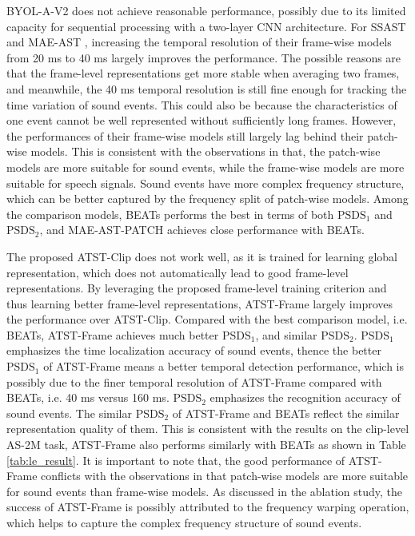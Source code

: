 BYOL-A-V2 does not achieve reasonable performance, possibly due to its limited capacity for sequential processing with a two-layer CNN architecture.
For SSAST \cite{gong_ssast_2022} and MAE-AST \cite{baade_mae-ast_2022}, increasing the temporal resolution of their frame-wise models from 20 ms to 40 ms largely improves the performance. The possible reasons are that the frame-level representations get more stable when averaging two frames, and meanwhile, the 40 ms temporal resolution is still fine enough for tracking the time variation of sound events. This could also be because the characteristics of one event cannot be well represented without sufficiently long frames. However, the performances of their frame-wise models still largely lag behind their patch-wise models. This is consistent with the observations in \cite{gong_ssast_2022,baade_mae-ast_2022} that, the patch-wise models are more suitable for sound events, while the frame-wise models are more suitable for speech signals. Sound events have more complex frequency structure, which can be better captured by the frequency split of patch-wise models. Among the comparison models, BEATs performs the best in terms of both $\text{PSDS}_1$ and $\text{PSDS}_2$, and MAE-AST-PATCH achieves close performance with BEATs. 

The proposed ATST-Clip does not work well, as it is trained for learning global representation, which does not automatically lead to good frame-level representations. By leveraging the proposed frame-level training criterion and thus learning better frame-level representations, ATST-Frame largely improves the performance over ATST-Clip.  Compared with the best comparison model, i.e. BEATs, ATST-Frame achieves much better $\text{PSDS}_1$, and similar $\text{PSDS}_2$. 
$\text{PSDS}_1$ emphasizes the time localization accuracy of sound events, thence the better $\text{PSDS}_1$ of ATST-Frame means a better temporal detection performance, which is possibly due to the finer temporal resolution of ATST-Frame compared with BEATs, i.e. 40 ms versus 160 ms. 
$\text{PSDS}_2$ emphasizes the recognition accuracy of sound events. The similar $\text{PSDS}_2$ of ATST-Frame and BEATs reflect the similar representation quality of them. This is consistent with the results on the clip-level AS-2M task, ATST-Frame also performs similarly with BEATs as shown in Table \ref{tab:le_result}. It is important to note that, the good performance of ATST-Frame conflicts with the observations in \cite{gong_ssast_2022,baade_mae-ast_2022} that patch-wise models are more suitable for sound events than frame-wise models. As discussed in the ablation study, the success of ATST-Frame is possibly attributed to the frequency warping operation, which helps to capture the complex frequency structure of sound events. 








